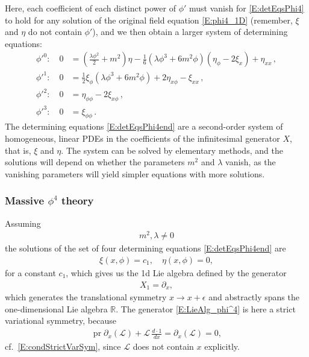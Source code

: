 \documentclass[a4paper,hidelinks, 12pt]{article}
\numberwithin{equation}{section}
\theoremstyle{plain}
\newcommand{\nn}{\nonumber}
\newcommand{\mc}{\mathcal}
\newcommand{\on}{\operatorname}
\begin{document}
 Here, each coefficient of each distinct power of $\phi'$
must vanish for \eqref{E:detEqsPhi4} to hold for any solution of the original 
field equation \eqref{E:phi4_1D} (remember, $\xi$ and $\eta$ do not contain $\phi'$), and we then obtain a larger system of determining equations:
\begin{align}\label{E:detEqsPhi4end}
{\phi'}^0:\quad	0&=\left(\tfrac{\lambda  \phi ^2}{2}+m^2\right) \eta -\tfrac{1}{6}
   \left(\lambda  \phi ^3+6 m^2 \phi \right) \left(\eta _{\phi }-2 \xi _{x}\right)\nn +\eta_{xx}\, , \nn \\
	{\phi'}^1:\quad	0&=\tfrac{1}{2} \xi_{\phi } \left(\lambda  \phi ^3+6 m^2 \phi \right)+2 \eta
   _{x\phi }-\xi _{xx}\, , \nn \\
	{\phi'}^2:\quad	0&= \eta _{\phi \phi }-2 \xi _{x\phi }\, , \nn \\
	{\phi'}^3:\quad	0&= \xi _{\phi \phi }\, .
\end{align}
The determining equations \eqref{E:detEqsPhi4end} are a second-order system
of homogeneous, linear PDEs in the coefficients of the infinitesimal generator $X$, that is, $\xi$
and $\eta$. The system can be solved by elementary methods, and the solutions will depend on whether the parameters $m^2$ and $\lambda$ vanish, as the vanishing parameters will yield simpler equations with more solutions.
\subsubsection{Massive $\phi^4$ theory}
\label{sec:MassivePhi4Theory}
Assuming 
\begin{align}
	m^2,\lambda\ne 0
\end{align}
the solutions of the set of four determining equations \eqref{E:detEqsPhi4end}
are 
\begin{align}
	\xi(x,\phi)=c_1, \quad
	\eta(x,\phi)=0,
\end{align}
for a constant $c_1$, which gives us the 1d Lie algebra defined by the generator
\begin{align}\label{E:LieAlg_phi^4}
	X_1= \partial_x,
\end{align}
 which generates the translational symmetry $x \to x + \epsilon$ and
abstractly spans the one-dimensional Lie algebra $\mathbb{R}$.
 The generator \eqref{E:LieAlg_phi^4} is here a strict variational symmetry, because 
	\begin{align}
	\on{pr}\partial_x (\mc{L})+\mc{L}\,\frac{d\cdot 1}{dx} = \partial_x (\mc{L})=0,
	\end{align}
 cf.~\eqref{E:condStrictVarSym}, since $\mc{L}$ does not contain $x$ explicitly.
\end{document}
